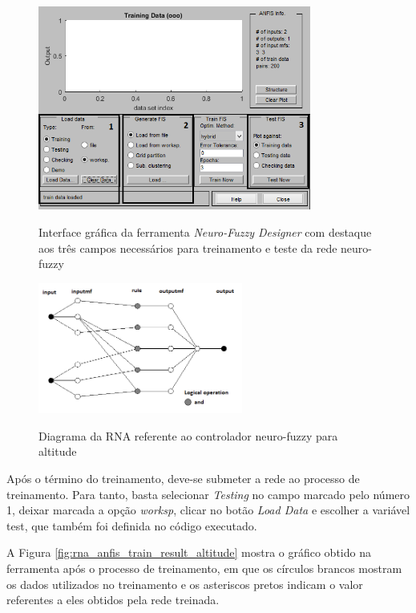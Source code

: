 \begin{figure}[!htb]
    \centering
    \caption{Interface gráfica da ferramenta \textit{Neuro-Fuzzy Designer} com destaque aos três campos necessários para treinamento e teste da rede neuro-fuzzy}
    \includegraphics[width=0.8\textwidth]{./04-figuras/anfisedit/anfisedit_screen}
    \label{fig:anfisedit_screen}
\end{figure}

\begin{figure}[!htb]
    \centering
    \caption{Diagrama da RNA referente ao controlador neuro-fuzzy para altitude}
    \includegraphics[width=0.6\textwidth]{./04-figuras/anfisedit/rna_anfis_altitude_gray}
    \label{fig:rna_anfis_altitude_gray}
\end{figure}

Após o término do treinamento, deve-se submeter a rede ao processo de treinamento. Para tanto, basta selecionar \textit{Testing} no campo marcado pelo número 1, deixar marcada a opção \textit{worksp}, clicar no botão \textit{Load Data} e escolher a variável {\ttfamily test}, que também foi definida no código executado.

A Figura \ref{fig:rna_anfis_train_result_altitude} mostra o gráfico obtido na ferramenta após o processo de treinamento, em que os círculos brancos mostram os dados utilizados no treinamento e os asteriscos pretos indicam o valor referentes a eles obtidos pela rede treinada.

